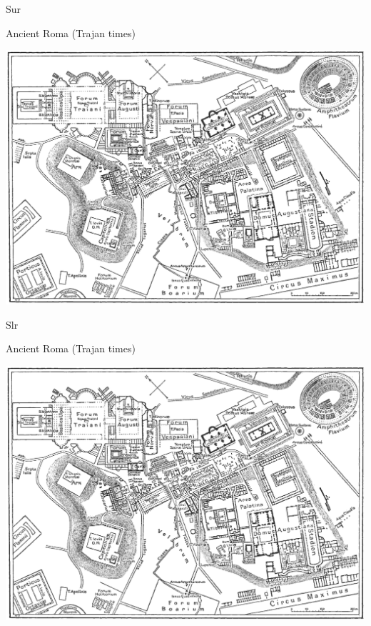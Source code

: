 \documentclass[print,Draft]{faosyb}
\begin{document}
\begin{map}{S}{ur}
\caption{Ancient Roma  (Trajan times)}
\label{map:roma}
\includegraphics[width=\chartwidth,height=\chartheight]{Rome}
\end{map}


\begin{map}{S}{lr}
\caption{Ancient Roma  (Trajan times)}
\label{map:roma}
\includegraphics[width=\chartwidth,height=\chartheight]{Rome}
\end{map}
\end{document}
